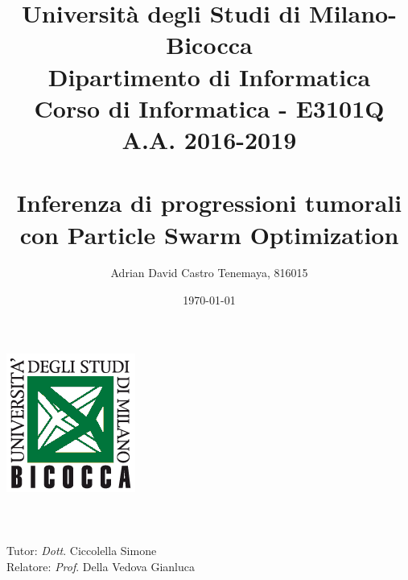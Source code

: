 \documentclass[12pt,letterpaper]{report}
\author{Adrian David Castro Tenemaya, 816015}
\title{Università degli Studi di Milano-Bicocca \\{\small Dipartimento di Informatica \\ Corso di Informatica - E3101Q\\A.A. 2016-2019\\\vspace*{0.55in} \ }\\ Inferenza di progressioni tumorali con Particle Swarm Optimization \vspace*{1.25in}}
\date{\today}
\begin{document}


\makeatletter
    \begin{titlepage}
        \begin{center}
            \includegraphics{disco.png}\\[4ex]
            {\huge \@title} \\
            {\@author} \\
            {\@date} \\
            Tutor: \textit{Dott}. Ciccolella Simone \\
            Relatore: \textit{Prof}. Della Vedova Gianluca
        \end{center}
    \end{titlepage}
\makeatother



\newpage
\thispagestyle{empty}
\tableofcontents
\listoffigures
\listoftables

\newpage

\cfoot{\thepage}



\newpage

\appendix

\printbibliography

\end{document}
